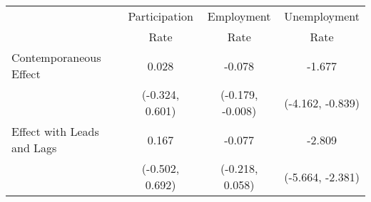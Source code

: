 \begin{tabular}{l|c|c|c}
\hline
\hline
& Participation & Employment & Unemployment \\
& Rate          & Rate       & Rate \\
\hline
Contemporaneous Effect
& 0.028 & -0.078 & -1.677 \\
& {\scriptsize (-0.324, 0.601)}& {\scriptsize (-0.179, -0.008)}& {\scriptsize (-4.162, -0.839)}\\ [0.1cm]
\hline
Effect with Leads and Lags
& 0.167 & -0.077 & -2.809 \\
& {\scriptsize (-0.502, 0.692)}& {\scriptsize (-0.218, 0.058)}& {\scriptsize (-5.664, -2.381)}\\ [0.1cm]
\hline
\hline
\end{tabular}
